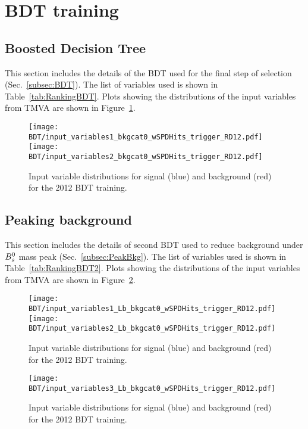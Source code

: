 \clearpage

\section{BDT training}\label{sec:app:BDT}
\subsection{Boosted Decision Tree}

 This section includes the details of the BDT used for the final step of selection (Sec.~\ref{subsec:BDT}). The list of variables used is shown in Table~\ref{tab:RankingBDT}. Plots showing the distributions of the input variables from TMVA are shown in Figure~\ref{fig:BDTvariables}.
 \begin{figure}[htb]
  \begin{center}
    \texttt{[image: BDT/input\_variables1\_bkgcat0\_wSPDHits\_trigger\_RD12.pdf]} \\
    \texttt{[image: BDT/input\_variables2\_bkgcat0\_wSPDHits\_trigger\_RD12.pdf]} 
  \end{center}
  \caption{
   Input variable distributions for signal (blue) and background (red) for the 2012 BDT training.
}
  \label{fig:BDTvariables}
\end{figure}

\subsection{Peaking background}

 This section includes the details of second BDT used to reduce background under ${{B}^0_{s}}$ mass peak (Sec.~\ref{subsec:PeakBkg}). The list of variables used is shown in Table~\ref{tab:RankingBDT2}. Plots showing the distributions of the input variables from TMVA are shown in Figure~\ref{fig:BDTvariables2}.
 \begin{figure}[htb]
  \begin{center}
    \texttt{[image: BDT/input\_variables1\_Lb\_bkgcat0\_wSPDHits\_trigger\_RD12.pdf]} \\
    \texttt{[image: BDT/input\_variables2\_Lb\_bkgcat0\_wSPDHits\_trigger\_RD12.pdf]} \\
  \end{center}
  \caption{
   Input variable distributions for signal (blue) and background (red) for the 2012 BDT training.
}
  \label{fig:BDTvariables2}
\end{figure}
 \begin{figure}[htb]
  \begin{center}
    \texttt{[image: BDT/input\_variables3\_Lb\_bkgcat0\_wSPDHits\_trigger\_RD12.pdf]}
  \end{center}
  \caption{
   Input variable distributions for signal (blue) and background (red) for the 2012 BDT training.
}
  \label{fig:BDTvariables2_1}
\end{figure}

